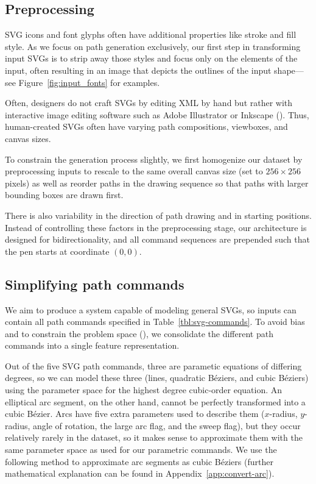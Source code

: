 \subsection{Preprocessing}
SVG icons and font glyphs often have additional properties like stroke and fill style.
As we focus on path generation exclusively, our first step in transforming input SVGs is to strip away those styles and focus only on the  elements of the input, often resulting in an image that depicts the outlines of the input shape---see Figure~\ref{fig:input_fonts} for examples.

Often, designers do not craft SVGs by editing XML by hand but rather with interactive image editing software such as Adobe Illustrator or Inkscape ().
Thus, human-created SVGs often have varying path compositions, viewboxes, and canvas sizes.

To constrain the generation process slightly, we first homogenize our dataset by preprocessing inputs to rescale to the same overall canvas size (set to $256\times 256$ pixels) as well as reorder paths in the drawing sequence so that paths with larger bounding boxes are drawn first.

There is also variability in the direction of path drawing and in starting positions. Instead of controlling these factors in the preprocessing stage, our architecture is designed for bidirectionality, and all command sequences are prepended such that the pen starts at coordinate $(0, 0)$.

\subsection{Simplifying path commands}
We aim to produce a system capable of modeling general SVGs, so inputs can contain all path commands specified in Table~\ref{tbl:svg-commands}.
To avoid bias and to constrain the problem space (), we consolidate the different path commands into a single feature representation.

Out of the five SVG path commands, three are parametic equations of differing degrees, so we can model these three (lines, quadratic B\'eziers, and cubic B\'eziers) using the parameter space for the highest degree cubic-order equation.
An elliptical arc segment, on the other hand, cannot be perfectly transformed into a cubic B\'ezier. Arcs have five extra parameters used to describe them ($x$-radius, $y$-radius, angle of rotation, the large arc flag, and the sweep flag), but they occur relatively rarely in the dataset, so it makes sense to approximate them with the same parameter space as used for our parametric commands.
We use the following method to approximate arc segments as cubic B\'eziers (further mathematical explanation can be found in Appendix~\ref{app:convert-arc}).

